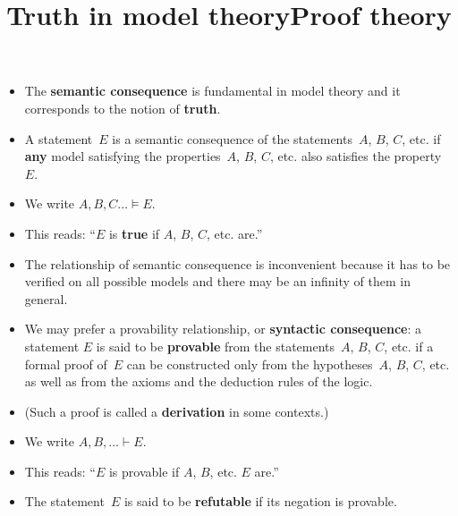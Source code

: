 \documentclass[wide]{slides}
\begin{document}
\begin{slide}
  \title{Truth in model theory}

  \begin{itemize}

    \item The \textbf{semantic consequence} is fundamental in model
      theory and it corresponds to the notion of \textbf{truth}.

    \item A statement~$E$ is a semantic consequence of the
      statements~$A$, $B$, $C$, etc. if \textbf{any} model satisfying
      the properties~$A$, $B$, $C$, etc. also satisfies the
      property~$E$.

    \item We write $A, B, C \ldots \models E$.

    \item This reads: ``$E$ is \textbf{true} if $A$, $B$, $C$,
      etc. are.''

  \end{itemize}

\end{slide}

\begin{slide}
  \title{Proof theory}

  \begin{itemize}

    \item The relationship of semantic consequence is inconvenient
      because it has to be verified on all possible models and there
      may be an infinity of them in general.

    \item We may prefer a provability relationship, or
      \textbf{syntactic consequence}: a statement $E$ is said to be
      \textbf{provable} from the statements~$A$, $B$, $C$, etc. if a
      formal proof of~$E$ can be constructed only from the
      hypotheses~$A$, $B$, $C$, etc. as well as from the axioms and
      the deduction rules of the logic.

    \item (Such a proof is called a \textbf{derivation} in some
      contexts.)

    \item We write $A, B, \ldots \vdash E$.

    \item This reads: ``$E$ is provable if $A$, $B$, etc. $E$ are.''

    \item The statement~$E$ is said to be \textbf{refutable} if its
      negation is provable.

  \end{itemize}

\end{slide}
\end{document}

